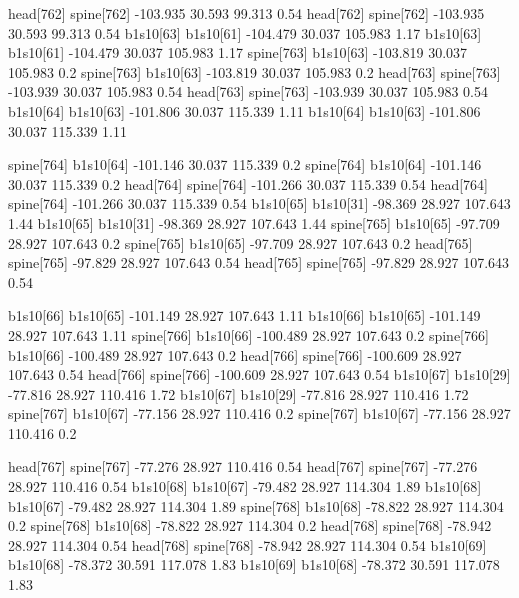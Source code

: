 head[762]    spine[762]    -103.935    30.593    99.313    0.54
head[762]    spine[762]    -103.935    30.593    99.313    0.54
b1s10[63]    b1s10[61]    -104.479    30.037    105.983    1.17
b1s10[63]    b1s10[61]    -104.479    30.037    105.983    1.17
spine[763]    b1s10[63]    -103.819    30.037    105.983    0.2
spine[763]    b1s10[63]    -103.819    30.037    105.983    0.2
head[763]    spine[763]    -103.939    30.037    105.983    0.54
head[763]    spine[763]    -103.939    30.037    105.983    0.54
b1s10[64]    b1s10[63]    -101.806    30.037    115.339    1.11
b1s10[64]    b1s10[63]    -101.806    30.037    115.339    1.11


spine[764]    b1s10[64]    -101.146    30.037    115.339    0.2
spine[764]    b1s10[64]    -101.146    30.037    115.339    0.2
head[764]    spine[764]    -101.266    30.037    115.339    0.54
head[764]    spine[764]    -101.266    30.037    115.339    0.54
b1s10[65]    b1s10[31]    -98.369    28.927    107.643    1.44
b1s10[65]    b1s10[31]    -98.369    28.927    107.643    1.44
spine[765]    b1s10[65]    -97.709    28.927    107.643    0.2
spine[765]    b1s10[65]    -97.709    28.927    107.643    0.2
head[765]    spine[765]    -97.829    28.927    107.643    0.54
head[765]    spine[765]    -97.829    28.927    107.643    0.54


b1s10[66]    b1s10[65]    -101.149    28.927    107.643    1.11
b1s10[66]    b1s10[65]    -101.149    28.927    107.643    1.11
spine[766]    b1s10[66]    -100.489    28.927    107.643    0.2
spine[766]    b1s10[66]    -100.489    28.927    107.643    0.2
head[766]    spine[766]    -100.609    28.927    107.643    0.54
head[766]    spine[766]    -100.609    28.927    107.643    0.54
b1s10[67]    b1s10[29]    -77.816    28.927    110.416    1.72
b1s10[67]    b1s10[29]    -77.816    28.927    110.416    1.72
spine[767]    b1s10[67]    -77.156    28.927    110.416    0.2
spine[767]    b1s10[67]    -77.156    28.927    110.416    0.2


head[767]    spine[767]    -77.276    28.927    110.416    0.54
head[767]    spine[767]    -77.276    28.927    110.416    0.54
b1s10[68]    b1s10[67]    -79.482    28.927    114.304    1.89
b1s10[68]    b1s10[67]    -79.482    28.927    114.304    1.89
spine[768]    b1s10[68]    -78.822    28.927    114.304    0.2
spine[768]    b1s10[68]    -78.822    28.927    114.304    0.2
head[768]    spine[768]    -78.942    28.927    114.304    0.54
head[768]    spine[768]    -78.942    28.927    114.304    0.54
b1s10[69]    b1s10[68]    -78.372    30.591    117.078    1.83
b1s10[69]    b1s10[68]    -78.372    30.591    117.078    1.83


